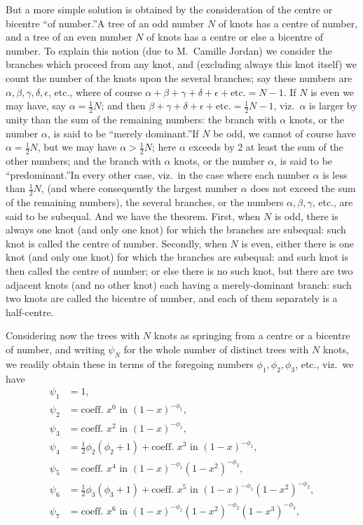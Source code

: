 \documentclass[11pt,a4paper]{article}
\begin{document}
But a more simple solution is obtained by the consideration of the
centre or bicentre ``of number.''\quad A tree of an odd number $N$ of
knots has a centre of number, and a tree of an even number $N$ of
knots has a centre or else a bicentre of number. To explain this notion
(due to M.\ Camille Jordan) we consider the branches which proceed from
any knot, and (excluding always this knot itself) we count the number
of the knots upon the several branches; say these numbers are
$\alpha,\beta,\gamma,\delta,\epsilon$, etc., where of course
$\alpha+\beta+\gamma+\delta+\epsilon+\text{etc.}=N-1$. If $N$ is even
we may have, say $\alpha=\tfrac{1}{2}N$; and then
$\beta+\gamma+\delta+\epsilon+\text{etc.}=\tfrac{1}{2}N-1$, viz.\
$\alpha$ is larger by unity than the sum of the remaining numbers: the
branch with $\alpha$ knots, or the number $\alpha$, is said to be
``merely dominant.''\quad If $N$ be odd, we cannot of course have
$\alpha=\tfrac{1}{2}N$, but we may have $\alpha>\tfrac{1}{2}N$; here
$\alpha$ exceeds by 2 at least the sum of the other numbers; and the
branch with $\alpha$ knots, or the number $\alpha$, is said to be
``predominant.''\quad In every other case, viz.\ in the case where
each number $\alpha$ is less than $\tfrac{1}{2}N$, (and where
consequently the largest number $\alpha$ does not exceed the sum of
the remaining numbers), the several branches, or the numbers
$\alpha,\beta,\gamma$, etc., are said to be subequal. And we have the
theorem. First, when $N$ is odd, there is always one knot (and only
one knot) for which the branches are subequal: such knot is called the
centre of number. Secondly, when $N$ is even, either there is one knot
(and only one knot) for which the branches are subequal: and such knot
is then called the centre of number; or else there is no such knot,
but there are two adjacent knots (and no other knot) each having a
merely-dominant branch: such two knots are called the bicentre of
number, and each of them separately is a half-centre.

Considering now the trees with $N$ knots as springing from a centre or
a bicentre of number, and writing $\psi_{N}$ for the whole number of
distinct trees with $N$ knots, we readily obtain these in terms of the
foregoing numbers $\phi_{1},\phi_{2},\phi_{3}$, etc., viz.\ we have
\begin{align*}
  \psi_{1} &= 1,\\
  \psi_{2} &= \text{coeff.\ }x^{0}\text{ in }(1-x)^{-\phi_{1}},\\
  \psi_{3} &= \text{coeff.\ }x^{2}\text{ in }(1-x)^{-\phi_{1}},\\
  \psi_{4} &= \tfrac{1}{2}\phi_{2}(\phi_{2}+1)+\text{coeff.\ }x^{3}\text{ in }(1-x)^{-\phi_{1}},\\
  \psi_{5} &= \text{coeff.\ }x^{4}\text{ in }(1-x)^{-\phi_{1}}(1-x^{2})^{-\phi_{2}},\\
  \psi_{6} &= \tfrac{1}{2}\phi_{3}(\phi_{3}+1)+\text{coeff.\ }x^{5}\text{ in }(1-x)^{-\phi_{1}}(1-x^{2})^{-\phi_{2}},\\
  \psi_{7} &= \text{coeff.\ }x^{6}\text{ in }(1-x)^{-\phi_{1}}(1-x^{2})^{-\phi_{2}}(1-x^{3})^{-\phi_{3}},
\end{align*}
\end{document}

